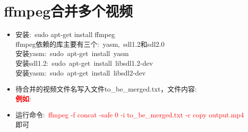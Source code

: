 \documentclass{article}      %
\begin{document}
\section{ffmpeg合并多个视频}
\begin{itemize}
	\item 安装:~\textrm{sudo apt-get install ffmpeg}\\
		\textrm{ffmpeg}依赖的库主要有三个:~\textrm{yasm},~\textrm{sdl1.2}和\textrm{sdl2.0}\\
		安装\textrm{yasm}:~\textrm{sudo~apt-get~install~yasm}\\
		安装\textrm{sdl1.2}:~\textrm{sudo~apt-get~install~libsdl1.2-dev}\\
		安装\textrm{yasm}:~\textrm{sudo~apt-get~install~libsdl2-dev}
	\item 待合并的视频文件名写入文件\textrm{to\_be\_merged.txt}，文件内容:\\
		\textcolor{red}{\textbf{例如}}: %
	\item 运行命令:~\textcolor{red}{\textrm{ffmpeg -f concat -safe 0 -i to\_be\_merged.txt -c copy output.mp4}}即可
\end{itemize}









\end{document}
